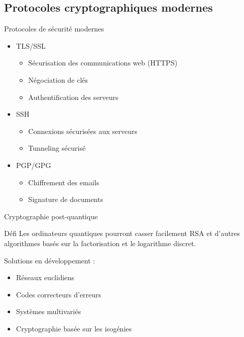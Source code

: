 \subsection*{Protocoles cryptographiques modernes}

\begin{frame}{Protocoles de sécurité modernes}
  \begin{itemize}
    \item TLS/SSL
      \begin{itemize}
        \item Sécurisation des communications web (HTTPS)
        \item Négociation de clés
        \item Authentification des serveurs
      \end{itemize}
    \item SSH
      \begin{itemize}
        \item Connexions sécurisées aux serveurs
        \item Tunneling sécurisé
      \end{itemize}
    \item PGP/GPG
      \begin{itemize}
        \item Chiffrement des emails
        \item Signature de documents
      \end{itemize}
  \end{itemize}
\end{frame}

\begin{frame}{Cryptographie post-quantique}
  \begin{block}{Défi}
    Les ordinateurs quantiques pourront casser facilement RSA et d'autres algorithmes basés sur la factorisation et le logarithme discret.
  \end{block}

  Solutions en développement :
  \begin{itemize}
    \item Réseaux euclidiens
    \item Codes correcteurs d'erreurs
    \item Systèmes multivariés
    \item Cryptographie basée sur les isogénies
  \end{itemize}
\end{frame}

